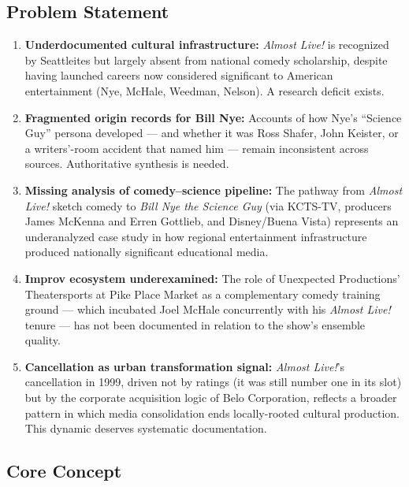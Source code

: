 \documentclass[11pt,letterpaper]{article}
\begin{document}
\subsection{Problem Statement}

\begin{enumerate}
  \item \textbf{Underdocumented cultural infrastructure:} \textit{Almost Live!} is recognized by Seattleites but largely absent from national comedy scholarship, despite having launched careers now considered significant to American entertainment (Nye, McHale, Weedman, Nelson). A research deficit exists.

  \item \textbf{Fragmented origin records for Bill Nye:} Accounts of how Nye's ``Science Guy'' persona developed --- and whether it was Ross Shafer, John Keister, or a writers'-room accident that named him --- remain inconsistent across sources. Authoritative synthesis is needed.

  \item \textbf{Missing analysis of comedy--science pipeline:} The pathway from \textit{Almost Live!} sketch comedy to \textit{Bill Nye the Science Guy} (via KCTS-TV, producers James McKenna and Erren Gottlieb, and Disney/Buena Vista) represents an underanalyzed case study in how regional entertainment infrastructure produced nationally significant educational media.

  \item \textbf{Improv ecosystem underexamined:} The role of Unexpected Productions' Theatersports at Pike Place Market as a complementary comedy training ground --- which incubated Joel McHale concurrently with his \textit{Almost Live!} tenure --- has not been documented in relation to the show's ensemble quality.

  \item \textbf{Cancellation as urban transformation signal:} \textit{Almost Live!}'s cancellation in 1999, driven not by ratings (it was still number one in its slot) but by the corporate acquisition logic of Belo Corporation, reflects a broader pattern in which media consolidation ends locally-rooted cultural production. This dynamic deserves systematic documentation.
\end{enumerate}

\subsection{Core Concept}
\end{document}
